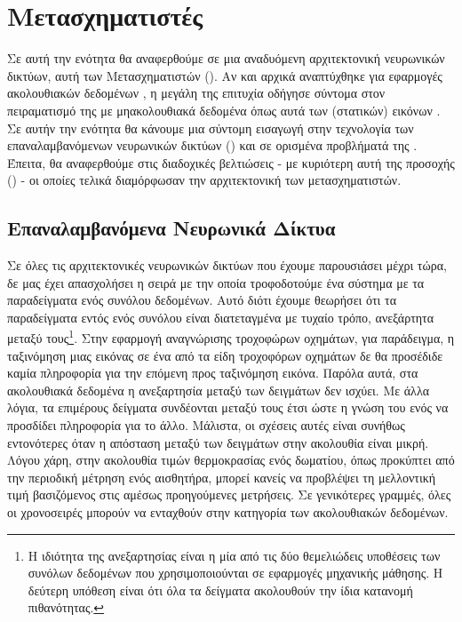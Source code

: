 \section{Μετασχηματιστές}

Σε αυτή την ενότητα θα αναφερθούμε σε μια αναδυόμενη αρχιτεκτονική νευρωνικών δικτύων, αυτή των Μετασχηματιστών (). Αν και αρχικά αναπτύχθηκε για εφαρμογές ακολουθιακών δεδομένων \cite{transformers_attention_is_all_you_need}, η μεγάλη της επιτυχία οδήγησε σύντομα στον πειραματισμό της με μη\textendash ακολουθιακά δεδομένα όπως αυτά των (στατικών) εικόνων \cite{dosovitskiy2020image_is_worth_16, carion2020_end_to_end_transformers}. Σε αυτήν την ενότητα θα κάνουμε μια σύντομη εισαγωγή στην τεχνολογία των επαναλαμβανόμενων νευρωνικών δικτύων ()\cite{rumelhart1985learning_internal_representations} και σε ορισμένα προβλήματά της \cite{hochreiter1997lstm,bahdanau2014neural_machine_translation_attention_begins, transformers_attention_is_all_you_need}. Έπειτα, θα αναφερθούμε στις διαδοχικές βελτιώσεις - με κυριότερη αυτή της προσοχής ()\cite{bahdanau2014neural_machine_translation_attention_begins} - οι οποίες τελικά διαμόρφωσαν την αρχιτεκτονική των μετασχηματιστών.

\subsection{Επαναλαμβανόμενα Νευρωνικά Δίκτυα}
Σε όλες τις αρχιτεκτονικές νευρωνικών δικτύων που έχουμε παρουσιάσει μέχρι τώρα, δε μας έχει απασχολήσει η σειρά με την οποία τροφοδοτούμε ένα σύστημα με τα παραδείγματα ενός συνόλου δεδομένων. Αυτό διότι έχουμε θεωρήσει ότι τα παραδείγματα εντός ενός συνόλου είναι διατεταγμένα με τυχαίο τρόπο, ανεξάρτητα μεταξύ τους\footnote{Η ιδιότητα της ανεξαρτησίας είναι η μία από τις δύο θεμελιώδεις υποθέσεις των συνόλων δεδομένων που χρησιμοποιούνται σε εφαρμογές μηχανικής μάθησης. Η δεύτερη υπόθεση είναι ότι όλα τα δείγματα ακολουθούν την ίδια κατανομή πιθανότητας.}. Στην εφαρμογή αναγνώρισης τροχοφώρων οχημάτων, για παράδειγμα, η ταξινόμηση μιας εικόνας σε ένα από τα είδη τροχοφόρων οχημάτων δε θα προσέδιδε καμία πληροφορία για την επόμενη προς ταξινόμηση εικόνα. Παρόλα αυτά, στα ακολουθιακά δεδομένα η ανεξαρτησία μεταξύ των δειγμάτων δεν ισχύει. Με άλλα λόγια, τα επιμέρους δείγματα συνδέονται μεταξύ τους έτσι ώστε η γνώση του ενός να προσδίδει πληροφορία για το άλλο. Μάλιστα, οι σχέσεις αυτές είναι συνήθως εντονότερες όταν η απόσταση μεταξύ των δειγμάτων στην ακολουθία είναι μικρή. Λόγου χάρη, στην ακολουθία τιμών θερμοκρασίας ενός δωματίου, όπως προκύπτει από την περιοδική μέτρηση ενός αισθητήρα, μπορεί κανείς να προβλέψει τη μελλοντική τιμή βασιζόμενος στις αμέσως προηγούμενες μετρήσεις. Σε γενικότερες γραμμές, όλες οι χρονοσειρές μπορούν να ενταχθούν στην κατηγορία των ακολουθιακών δεδομένων.\par

